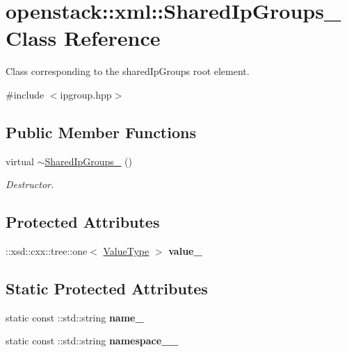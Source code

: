 \hypertarget{classopenstack_1_1xml_1_1SharedIpGroups__}{
\section{openstack::xml::SharedIpGroups\_\- Class Reference}
\label{classopenstack_1_1xml_1_1SharedIpGroups__}
}


Class corresponding to the sharedIpGroups root element.  




{\ttfamily \#include $<$ipgroup.hpp$>$}

\subsection*{Public Member Functions}
\begin{DoxyCompactItemize}
\item 
\hypertarget{classopenstack_1_1xml_1_1SharedIpGroups___a9adff55aec1f583a3d42be6311e066fe}{
virtual \hyperlink{classopenstack_1_1xml_1_1SharedIpGroups___a9adff55aec1f583a3d42be6311e066fe}{$\sim$SharedIpGroups\_\-} ()}
\label{classopenstack_1_1xml_1_1SharedIpGroups___a9adff55aec1f583a3d42be6311e066fe}

\begin{DoxyCompactList}\small\item\em Destructor. \item\end{DoxyCompactList}\end{DoxyCompactItemize}
\subsection*{Protected Attributes}
\begin{DoxyCompactItemize}
\item 
\hypertarget{classopenstack_1_1xml_1_1SharedIpGroups___a6554ce83aa3d2f5cb501b112eb7b0743}{
::xsd::cxx::tree::one$<$ \hyperlink{classopenstack_1_1xml_1_1SharedIpGroups}{ValueType} $>$ {\bfseries value\_\-}}
\label{classopenstack_1_1xml_1_1SharedIpGroups___a6554ce83aa3d2f5cb501b112eb7b0743}

\end{DoxyCompactItemize}
\subsection*{Static Protected Attributes}
\begin{DoxyCompactItemize}
\item 
\hypertarget{classopenstack_1_1xml_1_1SharedIpGroups___a39f38f83b4b58293aa6a8c6e1f71c138}{
static const ::std::string {\bfseries name\_\-}}
\label{classopenstack_1_1xml_1_1SharedIpGroups___a39f38f83b4b58293aa6a8c6e1f71c138}

\item 
\hypertarget{classopenstack_1_1xml_1_1SharedIpGroups___adef87a8596425378986f1107cb070105}{
static const ::std::string {\bfseries namespace\_\-\_\-}}
\label{classopenstack_1_1xml_1_1SharedIpGroups___adef87a8596425378986f1107cb070105}

\end{DoxyCompactItemize}
